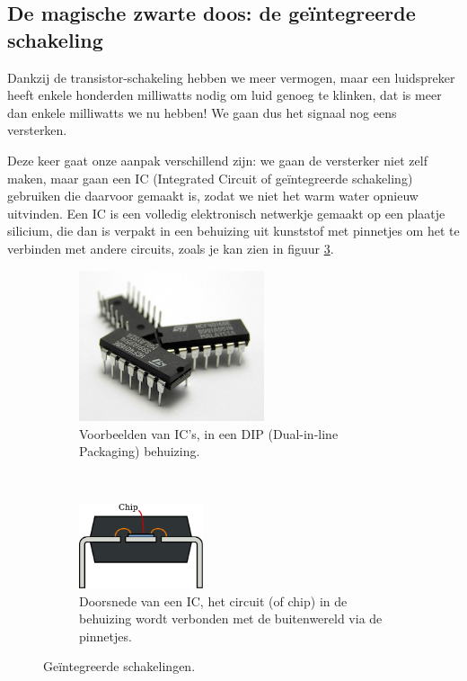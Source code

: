\documentclass{article}
\begin{document}
		\subsection{De magische zwarte doos: de ge\"integreerde schakeling}
			Dankzij de transistor-schakeling hebben we meer vermogen, maar een luidspreker heeft enkele honderden milliwatts nodig om luid genoeg te klinken, dat is meer dan enkele milliwatts we nu hebben! We gaan dus het signaal nog eens versterken.

			Deze keer gaat onze aanpak verschillend zijn: we gaan de versterker niet zelf maken, maar gaan een IC (Integrated Circuit of ge\"integreerde schakeling) gebruiken die daarvoor gemaakt is, zodat we niet het warm water opnieuw uitvinden. Een IC is een volledig elektronisch netwerkje gemaakt op een plaatje silicium, die dan is verpakt in een behuizing uit kunststof met pinnetjes om het te verbinden met andere circuits, zoals je kan zien in figuur \ref{fig:IC}.

			\begin{figure}[htbp]
			\centering
				\begin{subfigure}[b]{0.45\linewidth}
					\centering
					\includegraphics[width=0.6\textwidth]{IC}
					\caption{Voorbeelden van IC's, in een DIP (Dual-in-line Packaging) behuizing.}
					\label{subfig:IC_foto}
				\end{subfigure}
				~
				\begin{subfigure}[b]{0.45\linewidth}
					\centering
				\includegraphics[width=0.4\textwidth]{IC_doorsnede}
				\caption{Doorsnede van een IC, het circuit (of chip) in de behuizing wordt verbonden met de buitenwereld via de pinnetjes. }
				\label{subfig:IC_doorsnede}
				\end{subfigure}
				\caption{Ge\"integreerde schakelingen.}
				\label{fig:IC}
			\end{figure}
\end{document}
